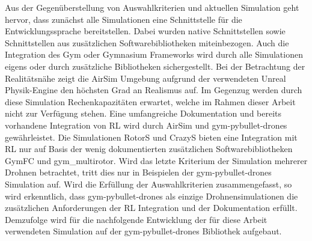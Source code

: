 Aus der Gegenüberstellung von Auswahlkriterien und aktuellen Simulation geht hervor, dass zunächst alle Simulationen eine Schnittstelle für die Entwicklungssprache bereitstellen.
Dabei wurden native Schnittstellen sowie Schnittstellen aus zusätzlichen Softwarebibliotheken miteinbezogen.
Auch die Integration des Gym oder Gymnasium Frameworks wird durch alle Simulationen eigens oder durch zusätzliche Bibliotheken sichergestellt.
Bei der Betrachtung der Realitätsnähe zeigt die AirSim Umgebung aufgrund der verwendeten Unreal Physik-Engine den höchsten Grad an Realismus auf.
Im Gegenzug werden durch diese Simulation Rechenkapazitäten erwartet, welche im Rahmen dieser Arbeit nicht zur Verfügung stehen.
Eine umfangreiche Dokumentation und bereits vorhandene Integration von RL wird durch AirSim und gym-pybullet-drones gewährleistet.
Die Simulationen RotorS und CrazyS bieten eine Integration mit RL nur auf Basis der wenig dokumentierten zusätzlichen Softwarebibliotheken GymFC und gym\_multirotor.
Wird das letzte Kriterium der Simulation mehrerer Drohnen betrachtet, tritt dies nur in Beispielen der gym-pybullet-drones Simulation auf.
Wird die Erfüllung der Auswahlkriterien zusammengefasst, so wird erkenntlich, dass gym-pybullet-drones als einzige Drohnensimulationen die zusätzlichen Anforderungen der RL Integration und der Dokumentation erfüllt.
Demzufolge wird für die nachfolgende Entwicklung der für diese Arbeit verwendeten Simulation auf der gym-pybullet-drones Bibliothek aufgebaut.

